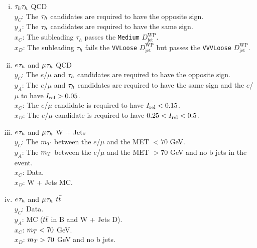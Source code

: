 \begin{enumerate}[i)]
   \item $\tau_{h}\tau_{h}$ \ac{QCD} \\
     \indent $y_C$: The $\tau_{h}$ candidates are required to have the opposite sign. \\
     \indent $y_A$: The $\tau_{h}$ candidates are required to have the same sign. \\
     \indent $x_C$: The subleading $\tau_h$ passes the \texttt{Medium} $D_{\text{jet}}^{\text{WP}}$. \\
     \indent $x_D$: The subleading $\tau_h$ fails the \texttt{VVLoose} $D_{\text{jet}}^{\text{WP}}$ but passes the \texttt{VVVLoose} $D_{\text{jet}}^{\text{WP}}$.
  \item $e_{}\tau_{h}$ and $\mu_{}\tau_{h}$ \ac{QCD} \\
    \indent $y_C$: The $e$/$\mu$ and $\tau_{h}$ candidates are required to have the opposite sign. \\
    \indent $y_A$: The $e$/$\mu$ and $\tau_{h}$ candidates are required to have the same sign and the $e$/$\mu$ to have $I_{\text{rel}}>0.05$. \\
    \indent $x_C$: The $e$/$\mu$ candidate is required to have $I_{\text{rel}}<0.15$. \\
    \indent $x_D$: The $e$/$\mu$ candidate is required to have $0.25<I_{\text{rel}}<0.5$.
  \item $e_{}\tau_{h}$ and $\mu_{}\tau_{h}$ W + Jets \\
    \indent $y_C$: The $m_{T}$ between the $e$/$\mu$ and the \ac{MET} $< 70$ GeV. \\
    \indent $y_A$: The $m_{T}$ between the $e$/$\mu$ and the \ac{MET} $> 70$ GeV and no b jets in the event. \\
    \indent $x_C$: Data. \\
    \indent $x_D$: W + Jets \ac{MC}.
  \item $e_{}\tau_{h}$ and $\mu_{}\tau_{h}$ $t\bar{t}$ \\
    \indent $y_C$: Data. \\
    \indent $y_A$: \ac{MC} ($t\bar{t}$ in B and W + Jets D). \\
    \indent $x_C$: $m_{T} < 70$ GeV. \\
    \indent $x_D$: $m_{T} > 70$ GeV and no b jets. \\
\end{enumerate}


